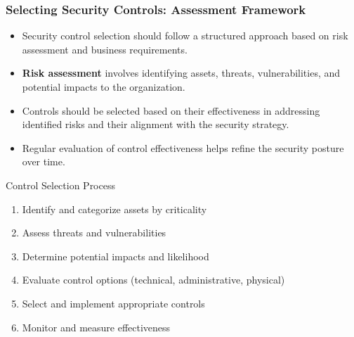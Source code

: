 \documentclass{beamer}
\begin{document}
\begin{frame}
    \frametitle{Selecting Security Controls: Assessment Framework}
    \begin{itemize}
        \item Security control selection should follow a structured approach based on risk assessment and business requirements.
        \item \textbf{Risk assessment} involves identifying assets, threats, vulnerabilities, and potential impacts to the organization.
        \item Controls should be selected based on their effectiveness in addressing identified risks and their alignment with the security strategy.
        \item Regular evaluation of control effectiveness helps refine the security posture over time.
    \end{itemize}
    
    \begin{exampleblock}{Control Selection Process}
        \begin{enumerate}
            \item Identify and categorize assets by criticality
            \item Assess threats and vulnerabilities
            \item Determine potential impacts and likelihood
            \item Evaluate control options (technical, administrative, physical)
            \item Select and implement appropriate controls
            \item Monitor and measure effectiveness
        \end{enumerate}
    \end{exampleblock}
\end{frame}
\end{document}
